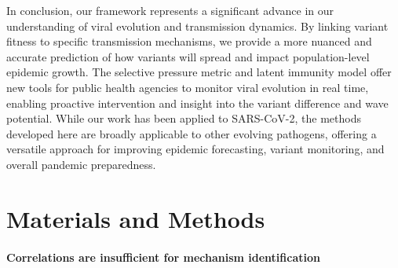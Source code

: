 \documentclass[11pt,oneside,letterpaper]{article}
\begin{document}
%


In conclusion, our framework represents a significant advance in our understanding of viral evolution and transmission dynamics.
By linking variant fitness to specific transmission mechanisms, we provide a more nuanced and accurate prediction of how variants will spread and impact population-level epidemic growth.
The selective pressure metric and latent immunity model offer new tools for public health agencies to monitor viral evolution in real time, enabling proactive intervention and insight into the variant difference and wave potential.
While our work has been applied to SARS-CoV-2, the methods developed here are broadly applicable to other evolving pathogens, offering a versatile approach for improving epidemic forecasting, variant monitoring, and overall pandemic preparedness.

\section*{Materials and Methods}

\paragraph{Correlations are insufficient for mechanism identification}
\end{document}
